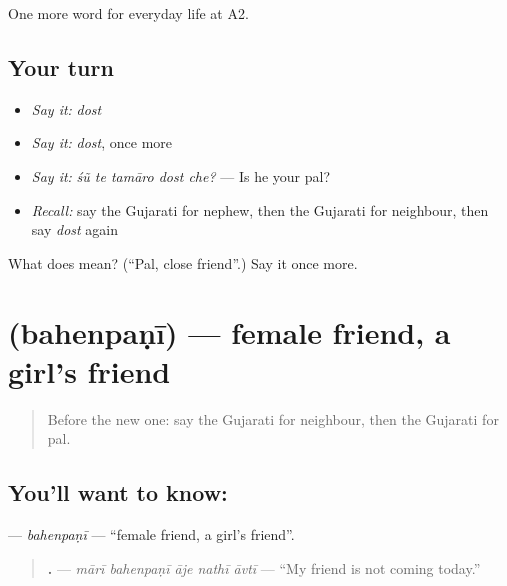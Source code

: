 \begin{grammarlens}[title={What you've built}]
One more word for everyday life at A2.
\end{grammarlens}

\subsection*{Your turn}
\begin{itemize}
\raggedright
  \item \emph{Say it:} \emph{dost}
  \item \emph{Say it:} \emph{dost}, once more
  \item \emph{Say it:} \emph{śũ te tamāro dost che?} — Is he your pal?
  \item \emph{Recall:} say the Gujarati for nephew, then the Gujarati for neighbour, then say \emph{dost} again
\end{itemize}

\begin{tcolorbox}[breakable,colback=teal!4,colframe=teal!35!black,title={Before you move on}]
What does  mean? (\textquotedblleft{}Pal, close friend\textquotedblright{}.) Say it once more.
\end{tcolorbox}
\section[\texorpdfstring{\gu{બહેનપણી} (bahenpaṇī)}{બહેનપણી (bahenpaṇī)}]{ (bahenpaṇī) — female friend, a girl's friend}

\label{lesson:GU-C264-bahenpani}



\begin{quote}
Before the new one: say the Gujarati for neighbour, then the Gujarati for pal.
\end{quote}

\subsection*{You'll want to know: }
\textbf{} — \emph{bahenpaṇī} — \textquotedblleft{}female friend, a girl's friend\textquotedblright{}.

\begin{quote}
\textbf{    .} — \emph{mārī bahenpaṇī āje nathī āvtī} — \textquotedblleft{}My friend is not coming today.\textquotedblright{}
\end{quote}

